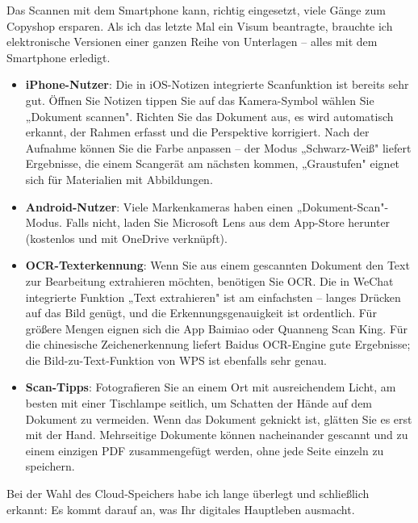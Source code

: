 
Das Scannen mit dem Smartphone kann, richtig eingesetzt, viele Gänge zum Copyshop ersparen. Als ich das letzte Mal ein Visum beantragte, brauchte ich elektronische Versionen einer ganzen Reihe von Unterlagen – alles mit dem Smartphone erledigt.

\begin{itemize}
  \item \textbf{iPhone-Nutzer}: Die in iOS-Notizen integrierte Scanfunktion ist bereits sehr gut. Öffnen Sie Notizen tippen Sie auf das Kamera-Symbol wählen Sie „Dokument scannen". Richten Sie das Dokument aus, es wird automatisch erkannt, der Rahmen erfasst und die Perspektive korrigiert. Nach der Aufnahme können Sie die Farbe anpassen – der Modus „Schwarz-Weiß" liefert Ergebnisse, die einem Scangerät am nächsten kommen, „Graustufen" eignet sich für Materialien mit Abbildungen.
  \item \textbf{Android-Nutzer}: Viele Markenkameras haben einen „Dokument-Scan"-Modus. Falls nicht, laden Sie Microsoft Lens aus dem App-Store herunter (kostenlos und mit OneDrive verknüpft).
  \item \textbf{OCR-Texterkennung}: Wenn Sie aus einem gescannten Dokument den Text zur Bearbeitung extrahieren möchten, benötigen Sie OCR. Die in WeChat integrierte Funktion „Text extrahieren" ist am einfachsten – langes Drücken auf das Bild genügt, und die Erkennungsgenauigkeit ist ordentlich. Für größere Mengen eignen sich die App Baimiao oder Quanneng Scan King. Für die chinesische Zeichenerkennung liefert Baidus OCR-Engine gute Ergebnisse; die Bild-zu-Text-Funktion von WPS ist ebenfalls sehr genau.
  \item \textbf{Scan-Tipps}: Fotografieren Sie an einem Ort mit ausreichendem Licht, am besten mit einer Tischlampe seitlich, um Schatten der Hände auf dem Dokument zu vermeiden. Wenn das Dokument geknickt ist, glätten Sie es erst mit der Hand. Mehrseitige Dokumente können nacheinander gescannt und zu einem einzigen PDF zusammengefügt werden, ohne jede Seite einzeln zu speichern.
\end{itemize}


Bei der Wahl des Cloud-Speichers habe ich lange überlegt und schließlich erkannt: Es kommt darauf an, was Ihr digitales Hauptleben ausmacht.

